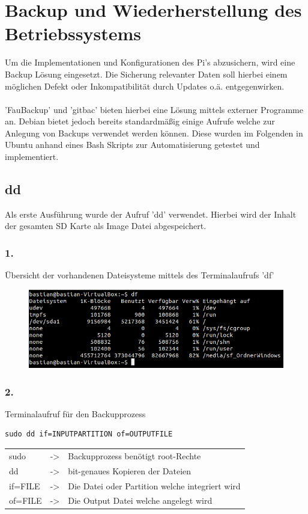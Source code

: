 \section{Backup und Wiederherstellung des Betriebssystems}

Um die Implementationen und Konfigurationen des Pi's abzusichern, wird eine Backup Lösung eingesetzt. Die Sicherung relevanter Daten soll hierbei einem möglichen Defekt oder Inkompatibilität durch Updates o.ä. entgegenwirken.\\
\\
'FauBackup' und 'gitbac' bieten hierbei eine Lösung mittels externer Programme an. Debian bietet jedoch bereits standardmäßig einige Aufrufe welche zur Anlegung von Backups verwendet werden können. Diese wurden im Folgenden in Ubuntu anhand eines Bash Skripts zur Automatisierung getestet und implementiert.\\

\subsection{dd}
Als erste Ausführung wurde der Aufruf 'dd' verwendet. Hierbei wird der Inhalt der gesamten SD Karte als Image Datei abgespeichert.

\subsubsection*{1.}
Übersicht der vorhandenen Dateisysteme mittels des Terminalaufrufs 'df'\\
\begin{figure}[ht]
\includegraphics[width=.8\textwidth]{pictures/Bastian/BILD1_df}
\end{figure}

\subsubsection*{2.}
Terminalaufruf für den Backupprozess
\lstset{language=bash,numbers=none,frame=single}
\begin{lstlisting}
sudo dd if=INPUTPARTITION of=OUTPUTFILE
\end{lstlisting}
\begin{tabular}{l c l}
sudo	& -> & Backupprozess benötigt root-Rechte\\
dd	& -> & bit-genaues Kopieren der Dateien\\
if=FILE	& -> & Die Datei oder Partition welche integriert wird\\
of=FILE & -> & Die Output Datei welche angelegt wird\\
\end{tabular}
\newpage %

